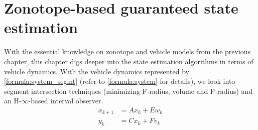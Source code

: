 \chapter{Zonotope-based guaranteed state estimation} \label{ch:state_estimation}
With the essential knowledge on zonotope and vehicle models from the previous chapter, this chapter digs deeper into the state estimation algorithms in terms of vehicle dynamics. With the vehicle dynamics represented by \eqref{formula:system_segint} (refer to \eqref{formula:system} for details), we look into segment intersection techniques (minimizing F-radius, volume and P-radius) and an H-$\infty$-based interval observer.
\begin{equation}
\label{formula:system_segint}
\begin{split}
x_{k+1} &= Ax_k + Ew_k\\
y_k &= Cx_k + Fv_k
\end{split}
\end{equation}
